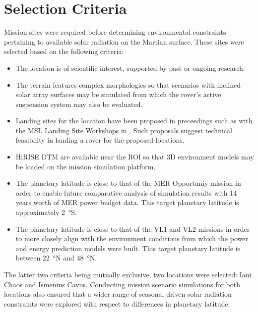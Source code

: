 \section{Selection Criteria}
\label{sec:MissionSites:SelectionCriteria}
Mission sites were required before determining environmental constraints pertaining to available solar radiation on the Martian surface. These sites were selected based on the following criteria:

\begin{itemize}
    \item The location is of scientific interest, supported by past or ongoing research.
    \item The terrain features complex morphologies so that scenarios with inclined solar array surfaces may be simulated from which the rover's active suspension system may also be evaluated.
    \item Landing sites for the location have been proposed in preceedings such as with the \ac{MSL} Landing Site Workshops in . Such proposals suggest technical feasibility in landing a rover for the proposed locations.
    \item \ac{HiRISE} \ac{DTM} are available near the \ac{ROI} so that 3D environment models may be loaded on the mission simulation platform.
    \item The planetary latitude is close to that of the \ac{MER} Opportuniy mission in order to enable future comparative analysis of simulation results with 14 years worth of \ac{MER} power budget data. This target planetary latitude is approximately \SI{2}{\degree}S.
    \item The planetary latitude is close to that of the \ac{VL1} and \ac{VL2} missions in order to more closely align with the environment conditions from which the power and energy prediction models were built. This target planetary latitude is between \SI{22}{\degree}N and \SI{48}{\degree}N.
\end{itemize}

The latter two criteria being mutually exclusive, two locations were selected: Iani Chaos and Ismenius Cavus. Conducting mission scenario simulations for both locations also ensured that a wider range of seasonal driven solar radiation constraints were explored with respect to differences in planetary latitude.

\clearpage

